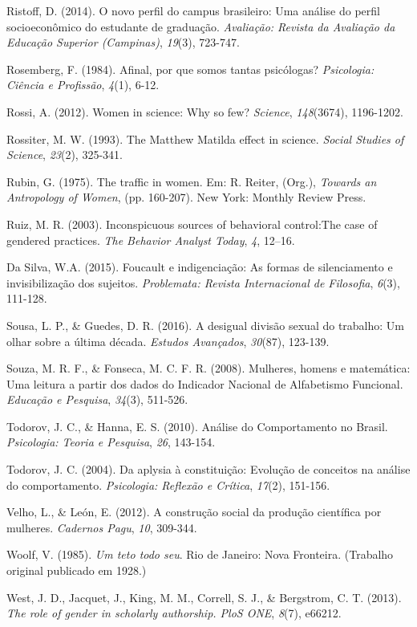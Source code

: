 \hangindent=25pt
\noindent Ristoff, D. (2014). O novo perfil do campus brasileiro: Uma análise do perfil socioeconômico do estudante de graduação. \textit{Avaliação: Revista da Avaliação da Educação Superior (Campinas)},\textit{ 19}(3), 723-747.

\hangindent=25pt
\noindent Rosemberg, F. (1984). Afinal, por que somos tantas psicólogas? \textit{Psicologia: Ciência e Profissão},\textit{ 4}(1), 6-12. 

\hangindent=25pt
\noindent Rossi, A. (2012). Women in science: Why so few? \textit{Science},\textit{ 148}(3674), 1196-1202.

\hangindent=25pt
\noindent Rossiter, M. W. (1993). The Matthew Matilda effect in science. \textit{Social Studies of Science},\textit{ 23}(2), 325-341. 

\hangindent=25pt
\noindent Rubin, G. (1975). The traffic in women. Em: R. Reiter, (Org.), \textit{Towards an Antropology of Women}, (pp. 160-207). New York: Monthly Review Press. 

\hangindent=25pt
\noindent Ruiz, M. R. (2003). Inconspicuous sources of behavioral control:\linebreak The case of gendered practices. \textit{The Behavior Analyst Today},\textit{ 4}, 12–16. 

\hangindent=25pt
\noindent Da Silva, W.A. (2015). Foucault e indigenciação: As formas de silenciamento e invisibilização dos sujeitos. \textit{Problemata: Revista Internacional de Filosofia},\textit{ 6}(3), 111-128. 

\hangindent=25pt
\noindent Sousa, L. P., \& Guedes, D. R. (2016). A desigual divisão sexual do trabalho: Um olhar sobre a última década. \textit{Estudos Avançados},\textit{ 30}(87), 123-139. 

\hangindent=25pt
\noindent Souza, M. R. F., \& Fonseca, M. C. F. R. (2008). Mulheres, homens e matemática: Uma leitura a partir dos dados do Indicador Nacional de Alfabetismo Funcional. \textit{Educação e Pesquisa},\textit{ 34}(3), 511-526. 

\hangindent=25pt
\noindent Todorov, J. C., \& Hanna, E. S. (2010). Análise do Comportamento no Brasil. \textit{Psicologia: Teoria e Pesquisa},\textit{ 26}, 143-154.

\hangindent=25pt
\noindent Todorov, J. C. (2004). Da aplysia à constituição: Evolução de conceitos na análise do comportamento. \textit{Psicologia: Reflexão e Crítica},\textit{ 17}(2), 151-156.

\hangindent=25pt
\noindent Velho, L., \& León, E. (2012). A construção social da produção científica por mulheres. \textit{Cadernos Pagu},\textit{ 10}, 309-344. 

\hangindent=25pt
\noindent Woolf, V. (1985). \textit{Um teto todo seu}. Rio de Janeiro: Nova Fronteira. (Trabalho original publicado em 1928.)

\hangindent=25pt
\noindent West, J. D., Jacquet, J., King, M. M., Correll, S. J., \& Bergstrom, C. T. (2013). \textit{The role of gender in scholarly authorship. PloS ONE},\textit{ 8}(7), e66212.